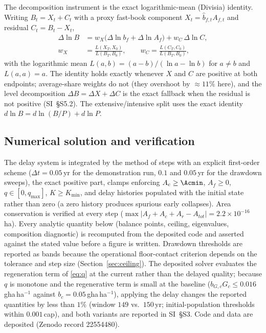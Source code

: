 The decomposition instrument is the exact logarithmic-mean (Divisia) identity. Writing $B_t=X_t+C_t$ with a proxy fast-book component $X_t=\hat b_{f,t}A_{f,t}$ and residual $C_t=B_t-X_t$,
\begin{equation}\label{eq:divisia}
\begin{split}
\Delta\ln B&=w_X\big(\Delta\ln b_f+\Delta\ln A_f\big)+w_C\,\Delta\ln C,\\
w_X&=\frac{L(X_T,X_0)}{L(B_T,B_0)},\qquad w_C=\frac{L(C_T,C_0)}{L(B_T,B_0)},
\end{split}
\end{equation}
with the logarithmic mean $L(a,b)=(a-b)/(\ln a-\ln b)$ for $a\neq b$ and $L(a,a)=a$. The identity holds exactly whenever $X$ and $C$ are positive at both endpoints; average-share weights do not (they overshoot by $\approx11\%$ here), and the level decomposition $\Delta B=\Delta X+\Delta C$ is the exact fallback when the residual is not positive (SI~\S S5.2). The extensive/intensive split uses the exact identity $d\ln B=d\ln(B/P)+d\ln P$.

\subsection{Numerical solution and verification}\label{sec:numerics}

The delay system is integrated by the method of steps with an explicit first-order scheme ($\Delta t=0.05$\,yr for the demonstration run, $0.1$ and $0.05$\,yr for the drawdown sweeps), the exact positive part, clamps enforcing $A_c\ge\Acmin$, $A_f\ge0$, $q\in[0,q_{\max}]$, $K\ge K_{\min}$, and delay histories populated with the initial state rather than zero (a zero history produces spurious early collapses). Area conservation is verified at every step ($\max|A_f+A_c+A_r-A_{tot}|=2.2\times10^{-16}$\,ha). Every analytic quantity below (balance points, ceiling, eigenvalues, composition diagnostic) is recomputed from the deposited code and asserted against the stated value before a figure is written. Drawdown thresholds are reported as bands because the operational floor-contact criterion depends on the tolerance and step size (Section~\ref{sec:ceiling}). The deposited solver evaluates the regeneration term of \eqref{eq:q} at the current rather than the delayed quality; because $q$ is monotone and the regenerative term is small at the baseline ($b_{G,c}G_c\le0.016$\,gha\,ha$^{-1}$ against $b_c=0.05$\,gha\,ha$^{-1}$), applying the delay changes the reported quantities by less than $1\%$ (window $149$ vs.\ $150$\,yr; initial-population thresholds within $0.001$\,cap), and both variants are reported in SI~\S S3. Code and data are deposited (Zenodo record 22554480).
